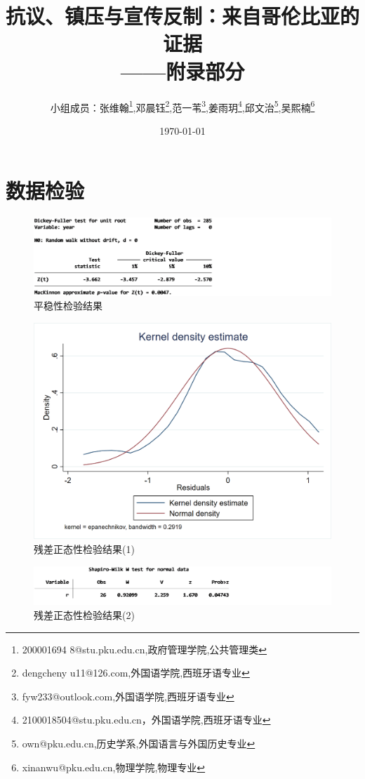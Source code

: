 \documentclass{phyasgn}\usepackage{nag}
\title{
  {抗议、镇压与宣传反制：来自哥伦比亚的证据}\\[-8pt]
    {\Large ——附录部分}
}
\author{小组成员：张维翰\thanks{200001694
8@stu.pku.edu.cn,政府管理学院,公共管理类},邓晨钰\thanks{dengcheny
u11@126.com,外国语学院,西班牙语专业},范一苇\thanks{fyw233@outlook.com,外国语学院,西班牙语专业},姜雨玥\thanks{2100018504@stu.pku.edu.cn，外国语学院,西班牙语专业},邱文治\thanks{own@pku.edu.cn,历史学系,外国语言与外国历史专业},吴熙楠\thanks{xinanwu@pku.edu.cn,物理学院,物理专业}}
\date{\today}
\begin{document}
\maketitle
\tableofcontents
\clearpage
\appendix
\section{数据检验}
\begin{figure}[!h]
                    	\centering
                    	\includegraphics[width=1.0\linewidth]{pic/18.png}
                    	\caption{平稳性检验结果}
                    	\end{figure}
\begin{figure}[!h]
                    	\centering
                    	\includegraphics[width=1.0\linewidth]{pic/19.png}
                    	\caption{残差正态性检验结果(1)}
                    	\end{figure}
\begin{figure}[!h]
                    	\centering
                    	\includegraphics[width=1.0\linewidth]{pic/20.png}
                    	\caption{残差正态性检验结果(2)}
                    	\end{figure}
\end{document}
